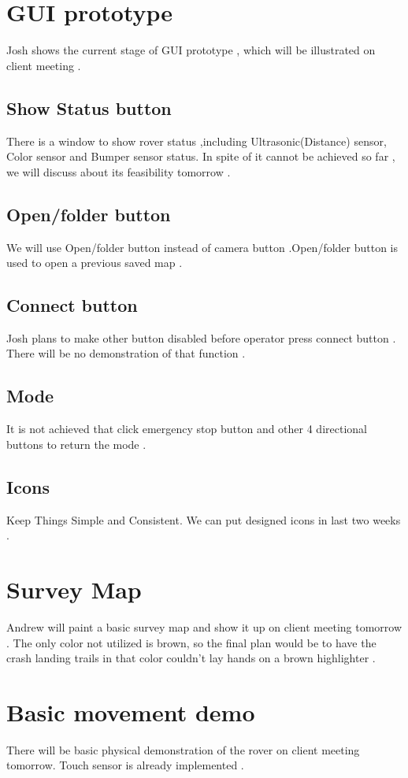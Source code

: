 \documentclass{article}
\begin{document}
\section{GUI prototype}
Josh shows the current stage of GUI prototype , which will be illustrated on client meeting .
\subsection{Show Status button}
There is a window to show rover status ,including Ultrasonic(Distance) sensor, Color sensor and Bumper sensor status. In spite of it cannot be achieved so far , we will discuss about its feasibility tomorrow .

\subsection{Open/folder button}
We will use Open/folder button instead of camera button .Open/folder button is used to open a previous saved map .

\subsection{Connect button}
Josh plans to make other button disabled before operator press connect button . There will be no demonstration of that function .

\subsection{Mode}
It is not achieved that click emergency stop button and other 4 directional buttons to return the mode .

\subsection{Icons}
Keep Things Simple and Consistent. We can put designed icons in last two weeks .

\section{Survey Map}
Andrew will paint a basic survey map and show it up on client meeting tomorrow  . The only color not utilized is brown, so the final plan would be to have the crash landing trails in that color couldn't lay hands on a brown highlighter .

\section{Basic movement demo}
There will be basic physical demonstration of the rover on client meeting tomorrow. Touch sensor is already implemented .
\end{document}
